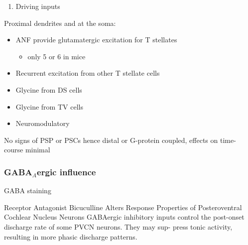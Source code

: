 \begin{enumerate}
\item Driving inputs
\end{enumerate}
Proximal dendrites and at the soma:

\begin{itemize}
\item ANF provide glutamatergic excitation for T stellates  \citep{Cant:1981,FerragamoGoldingEtAl:1998a,Alibardi:1998a}
\begin{itemize}
\item only 5 or 6 in mice \citep{FerragamoGoldingEtAl:1998a,CaoOertel:2010}
\end{itemize}
\item Recurrent excitation from other T stellate cells \citep{FerragamoGoldingEtAl:1998a}
\item Glycine from DS cells \citep{FerragamoGoldingEtAl:1998a}
\item Glycine from TV cells \citep{WickesbergOertel:1990,ZhangOertel:1993b}
\item Neuromodulatory
\end{itemize}
     No signs of PSP or PSCs hence distal or G-protein coupled, effects on time-course minimal

\subsubsection{GABA$_A$ergic influence}


GABA staining \citep{SaintMorestEtAl:1989}

\GABAa Receptor Antagonist Bicuculline Alters Response Properties
of Posteroventral Cochlear Nucleus Neurons \citep{PalombiCaspary:1992}
GABAergic inhibitory inputs control the
post-onset discharge rate of some PVCN neurons. They may sup-
press tonic activity, resulting in more phasic discharge patterns.



